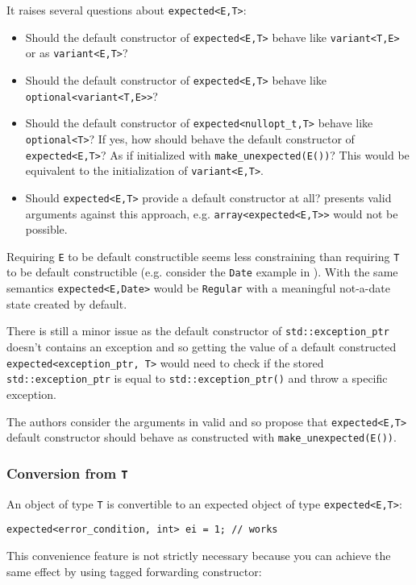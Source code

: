 \documentclass[a4paper,10pt]{article}
\newcommand{\cpp}[1]{\lstinline{#1}}
\begin{document}
\noindent
It raises several questions about \cpp{expected<E,T>}:

\begin{itemize}
\item Should the default constructor of \cpp{expected<E,T>} behave like \cpp{variant<T,E>} or as \cpp{variant<E,T>}?
\item Should the default constructor of \cpp{expected<E,T>} behave like \cpp{optional<variant<T,E>>}?
\item Should the default constructor of \cpp{expected<nullopt_t,T>} behave like \cpp{optional<T>}? If yes, how should behave the default constructor of \cpp{expected<E,T>}? As if initialized with \cpp{make_unexpected(E())}? This would be equivalent to the initialization of \cpp{variant<E,T>}.
\item Should \cpp{expected<E,T>} provide a default constructor at all? \cite{OptionalRev3} presents valid arguments against this approach, e.g. \cpp{array<expected<E,T>>} would not be possible. 
\end{itemize}

Requiring \cpp{E} to be default constructible seems less constraining than requiring \cpp{T} to be default constructible (e.g. consider the \cpp{Date} example in \cite{OptionalRev3}). With the same semantics \cpp{expected<E,Date>} would be \cpp{Regular} with a meaningful not-a-date state created by default.

There is still a minor issue as the default constructor of \cpp{std::exception_ptr} doesn't contains an exception and so getting the value of a default constructed \cpp{expected<exception_ptr, T>} would need to check if the stored \cpp{std::exception_ptr} is equal to \cpp{std::exception_ptr()} and throw a specific exception.

The authors consider the arguments in  \cite{OptionalRev3} valid and so propose that \cpp{expected<E,T>} default constructor should behave as constructed with \cpp{make_unexpected(E())}.

\subsubsection{Conversion from \cpp{T}}

An object of type \cpp{T} is convertible to an expected object of type \cpp{expected<E,T>}:

\begin{lstlisting}
expected<error_condition, int> ei = 1; // works
\end{lstlisting}
\noindent
This convenience feature is not strictly necessary because you can achieve the same effect by using tagged forwarding constructor:
\end{document}
